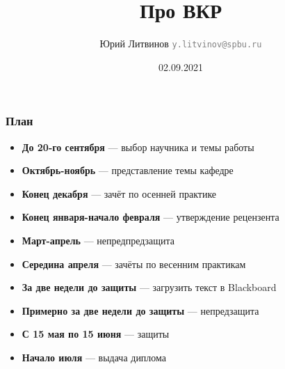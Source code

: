 \documentclass[xetex,mathserif,serif]{beamer}
\title{Про ВКР}
\author[Юрий Литвинов]{Юрий Литвинов \newline \textcolor{gray}{\small\texttt{y.litvinov@spbu.ru}}}
\date{02.09.2021}
\begin{document}
    \frame{\titlepage}

    \begin{frame}
        \frametitle{План}
        \begin{itemize}
            \item \textbf{До 20-го сентября} --- выбор научника и темы работы
            \item \textbf{Октябрь-ноябрь} --- представление темы кафедре
            \item \textbf{Конец декабря} --- зачёт по осенней практике
            \item \textbf{Конец января-начало февраля} --- утверждение рецензента
            \item \textbf{Март-апрель} --- непредпредзащита
            \item \textbf{Середина апреля} --- зачёты по весенним практикам
            \item \textbf{За две недели до защиты} --- загрузить текст в Blackboard
            \item \textbf{Примерно за две недели до защиты} --- непредзащита
            \item \textbf{С 15 мая по 15 июня} --- защиты
            \item \textbf{Начало июля} --- выдача диплома
        \end{itemize}
    \end{frame}
    
\end{document}
